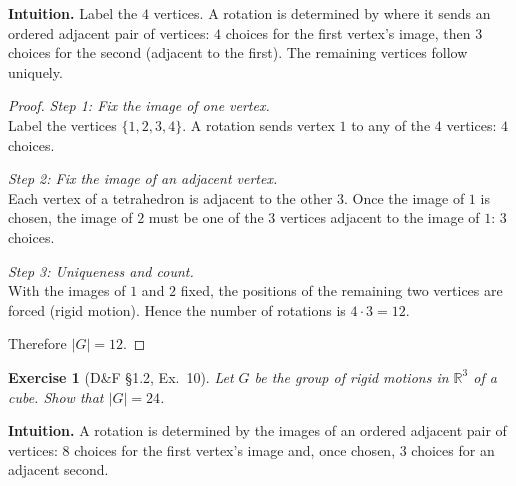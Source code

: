 \documentclass[12pt]{article}
\newtheorem{exercise}[theorem]{Exercise}
\theoremstyle{definition}
\begin{document}
\dotfill

\noindent
\textbf{Intuition.}
Label the $4$ vertices. A rotation is determined by where it sends an ordered adjacent pair of vertices:
$4$ choices for the first vertex’s image, then $3$ choices for the second (adjacent to the first). The remaining
vertices follow uniquely.

\dotfill

\begin{proof}
\noindent\emph{Step 1: Fix the image of one vertex.}\\

\noindent
Label the vertices $\{1,2,3,4\}$. A rotation sends vertex $1$ to any of the $4$ vertices: $4$ choices.

\dotfill

\noindent\emph{Step 2: Fix the image of an adjacent vertex.}\\

\noindent
Each vertex of a tetrahedron is adjacent to the other $3$. Once the image of $1$ is chosen, the image of $2$
must be one of the $3$ vertices adjacent to the image of $1$: $3$ choices.

\dotfill

\noindent\emph{Step 3: Uniqueness and count.}\\

\noindent
With the images of $1$ and $2$ fixed, the positions of the remaining two vertices are forced (rigid motion).
Hence the number of rotations is $4\cdot 3=12$.

\dotfill

Therefore $\lvert G\rvert=12$.
\end{proof}

\newpage

\begin{exercise}[D\&F §1.2, Ex.~10]
Let $G$ be the group of rigid motions in $\mathbb{R}^3$ of a cube. Show that $\lvert G\rvert=24$.
\end{exercise}

\dotfill

\noindent
\textbf{Intuition.}
A rotation is determined by the images of an ordered adjacent pair of vertices:
$8$ choices for the first vertex’s image and, once chosen, $3$ choices for an adjacent second.

\dotfill
\end{document}
